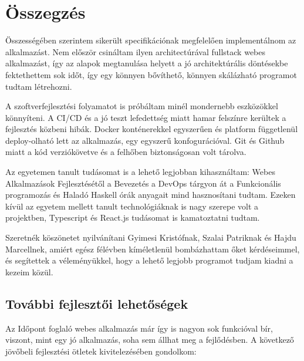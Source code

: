 \chapter{Összegzés} %
\label{ch:sum}

Összességében szerintem sikerült specifikációnak megfelelően implementálnom az alkalmazást. Nem először csináltam ilyen architectúrával fullstack webes alkalmazást, így az alapok megtanulása helyett a jó architektúrális döntésekbe fektethettem sok időt, így egy könnyen bővíthető, könnyen skálázható programot tudtam létrehozni.

A szoftverfejlesztési folyamatot is próbáltam minél mondernebb eszközökkel könnyíteni. A CI/CD és a jó teszt lefedettség miatt hamar felszínre kerültek a fejlesztés közbeni hibák. Docker konténerekkel egyszerűen és platform függetlenül deploy-olható lett az alkalmazás, egy egyszerű konfogurációval. Git és Github miatt a kód verziókövetve és a felhőben biztonságosan volt tárolva.

Az egyetemen tanult tudásomat is a lehető legjobban kihasználtam: Webes Alkalmazások Fejlesztésétől a Bevezetés a DevOps tárgyon át a Funkcionális programozás és Haladó Haskell órák anyagait mind hasznosítani tudtam. Ezeken kívül az egyetem mellett tanult technológiáknak is nagy szerepe volt a projektben, Typescript és React.js tudásomat is kamatoztatni tudtam.

Szeretnék köszönetet nyilvánítani Gyimesi Kristófnak, Szalai Patriknak és Hajdu Marcellnek, amiért egész félévben kíméletlenül bombázhattam őket kérdéseimmel, és segítettek a véleményükkel, hogy a lehető legjobb programot tudjam kiadni a kezeim közül.

\clearpage

\section{További fejlesztői lehetőségek}
Az Időpont foglaló webes alkalmazás már így is nagyon sok funkcióval bír, viszont, mint egy jó alkalmazás, soha sem állhat meg a fejlődésben. A következő jövőbeli fejlesztési ötletek kivitelezésében gondolkom:

